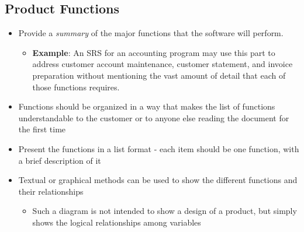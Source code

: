\documentclass[]{article}
\begin{document}
\subsection{Product Functions}
\label{sub:product_functions}
\begin{itemize}
	\item Provide a \emph{summary} of the major functions that the software will perform.
	\begin{itemize}
		\item \textbf{Example}: An SRS for an accounting program may use this part to address customer account maintenance, customer statement, and invoice preparation without mentioning the vast amount of detail that each of those functions requires.
	\end{itemize}
	\item Functions should be organized in a way that makes the list of functions understandable to the customer or to anyone else reading the document for the first time 
	\item Present the functions in a list format - each item should be one function, with a brief description of it
	\item Textual or graphical methods can be used to show the different functions and their relationships
	\begin{itemize}
		\item Such a diagram is not intended to show a design of a product, but simply shows the logical relationships among variables
	\end{itemize} 
\end{itemize}
\end{document}
